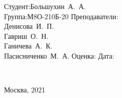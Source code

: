 \vspace{1em}
{
	\hfill\parbox{11cm}{
		\hspace*{10cm}\hspace*{-5cm}Студент:\hfill\hbox {Большухин А. А. \hfill}\\
		\hspace*{10cm}\hspace*{-5cm}Группа:\hfill\hbox {М8О-210Б-20}\vspace{2mm}
		\hspace*{10cm}\hspace*{-5cm}Преподаватели:\\
		\hspace*{10cm}\hspace*{-5cm}\hfill\hbox {Денисова И. П.}\\
		\hspace*{10cm}\hspace*{-5cm}\hfill\hbox {Гавриш О. Н.}\\
		\hspace*{10cm}\hspace*{-5cm}\hfill\hbox {Ганичева А. К.}\\
		\hspace*{10cm}\hspace*{-5cm}\hfill\hbox {Пасисниченко М. А.}\vspace{2mm}
		\hspace*{10cm}\hspace*{-5cm}Оценка:\hfill\hbox {}\vspace{2mm}
		\hspace*{10cm}\hspace*{-5cm}Дата:\hfill\hbox {}\\
	}
\\}
\vspace{\fill}
\centerline{Москва, 2021}
